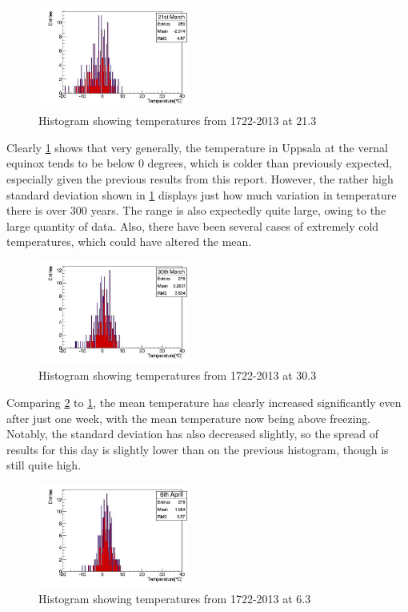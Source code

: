 \documentclass[a4paper,10pt,oneside]{article}
\begin{document}
\begin{figure}[!ht]
  \begin{center}
    \includegraphics[width=5cm]{../Code/Equinox_temps.jpg}
    \caption{Histogram showing temperatures from 1722-2013 at 21.3}
    \label{fig:vern}
  \end{center}
\end{figure}

Clearly \ref{fig:vern} shows that very generally, the temperature in Uppsala at the
vernal equinox tends to be below 0 degrees, which is colder than previously expected, especially given the previous
results from this report. However, the rather high standard deviation
shown in \ref{fig:vern} displays just how much variation in temperature there is over 300 years.
The range is also expectedly quite large, owing to the large quantity of data. Also, there have been several cases of extremely
cold temperatures, which could have altered the mean.

\begin{figure}[!ht]
 \includegraphics[width=5cm]{../Code/week.jpg}
 \caption{Histogram showing temperatures from 1722-2013 at 30.3}
 \label{fig:week}
\end{figure}

Comparing \ref{fig:week} to \ref{fig:vern}, the mean temperature has clearly increased significantly even
after just one week, with the mean temperature now being above freezing. Notably, the standard deviation
has also decreased slightly, so the spread of results for this day is slightly lower than on the previous histogram, though is
still quite high.

\begin{figure}[!ht]
 \includegraphics[width=5cm]{../Code/2week.jpg}
 \caption{Histogram showing temperatures from 1722-2013 at 6.3}
 \label{fig:twoweek}
\end{figure}
\end{document}
